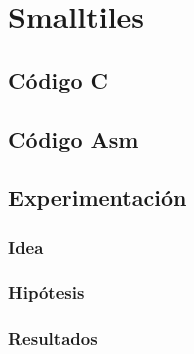 \section{Smalltiles}

\subsection{Código C}
	
\subsection{Código Asm}
	
	
	
\subsection{Experimentación}
\subsubsection{Idea}	

\subsubsection{Hipótesis}
	
	
\subsubsection{Resultados}
	